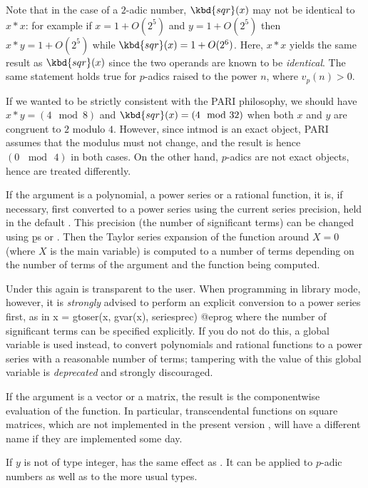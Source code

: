 Note that in the case of a $2$-adic number, $\kbd{sqr}(x)$ may not be
identical to $x*x$: for example if $x = 1+O(2^5)$ and $y = 1+O(2^5)$ then
$x*y = 1+O(2^5)$ while $\kbd{sqr}(x) = 1+O(2^6)$. Here, $x * x$ yields the
same result as $\kbd{sqr}(x)$ since the two operands are known to be
\emph{identical}. The same statement holds true for $p$-adics raised to the
power $n$, where $v_p(n) > 0$.

 If we wanted to be strictly consistent with
the PARI philosophy, we should have $x*y = (4 \mod 8)$ and $\kbd{sqr}(x) =
(4 \mod 32)$ when both $x$ and $y$ are congruent to $2$ modulo $4$.
However, since intmod is an exact object, PARI assumes that the modulus
must not change, and the result is hence $(0\, \mod\, 4)$ in both cases. On
the other hand, $p$-adics are not exact objects, hence are treated
differently.

\item If the argument is a polynomial, a power series or a rational function,
it is, if necessary, first converted to a power series using the current
series precision, held in the default . This precision
(the number of significant terms) can be changed using \b{ps} or
. Then the Taylor series expansion of the
function around $X=0$ (where $X$ is the main variable) is computed to a
number of terms depending on the number of terms of the argument and the
function being computed.

Under  this again is transparent to the user. When programming in
library mode, however, it is \emph{strongly} advised to perform an explicit
conversion to a power series first, as in
\bprog
  x = gtoser(x, gvar(x), seriesprec)
@eprog\noindent
where the number of significant terms  can be specified
explicitly. If you do not do this, a global variable  is used
instead, to convert polynomials and rational functions to a power series with
a reasonable number of terms; tampering with the value of this global
variable is \emph{deprecated} and strongly discouraged.


\item If the argument is a vector or a matrix, the result is the
componentwise evaluation of the function. In particular, transcendental
functions on square matrices, which are not implemented in the present
version \vers, will have a different name if they are implemented some day.

\subseckbd{\pow} If $y$ is not of type integer,  has the same
effect as . It can be applied to $p$-adic numbers as well
as to the more usual types.

